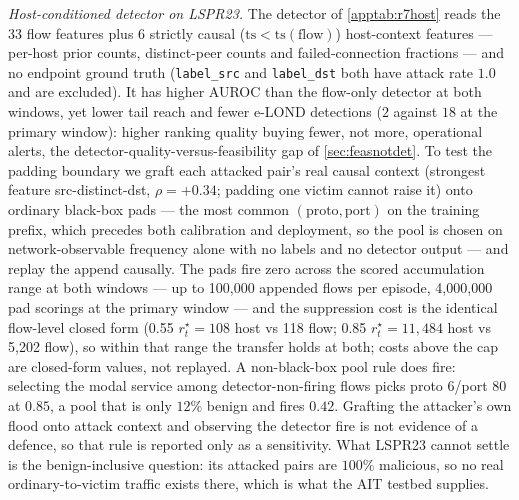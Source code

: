 \emph{Host-conditioned detector on LSPR23.} The detector of \cref{apptab:r7host} reads the 33 flow
features plus 6 strictly causal ($\mathrm{ts}<\mathrm{ts}(\text{flow})$) host-context features ---
per-host prior counts, distinct-peer counts and failed-connection fractions --- and no endpoint ground
truth (\texttt{label\_src} and \texttt{label\_dst} both have attack rate $1.0$ and are excluded). It has
higher AUROC than the flow-only detector at both windows, yet lower tail reach and fewer e-LOND
detections ($2$ against $18$ at the primary window): higher ranking quality buying fewer, not more,
operational alerts, the detector-quality-versus-feasibility gap of \cref{sec:feasnotdet}. To test the
padding boundary we graft each attacked pair's real causal context (strongest feature src-distinct-dst,
$\rho=+0.34$; padding one victim cannot raise it) onto ordinary black-box pads ---
the most common $(\text{proto},\text{port})$ on the training prefix, which precedes both calibration
and deployment, so the pool is chosen on network-observable frequency alone with no labels and no
detector output --- and replay the append causally. The pads fire zero across the scored accumulation
range at both windows --- up to 100{,}000 appended flows per episode, 4{,}000{,}000 pad scorings at the
primary window --- and the suppression cost is the identical flow-level closed form (0.55 $r^{\star}_t=108$ host vs 118 flow; 0.85 $r^{\star}_t=11{,}484$ host vs 5{,}202 flow),
so within that range the transfer holds at both; costs above the cap are closed-form values, not
replayed. A non-black-box pool rule does fire: selecting the modal service among detector-non-firing
flows picks proto 6/port 80 at $0.85$, a pool that is only $12\%$ benign and fires $0.42$. Grafting the attacker's own flood onto attack context and
observing the detector fire is not evidence of a defence, so that rule is reported only as a
sensitivity. What LSPR23 cannot settle is the benign-inclusive question: its attacked pairs are $100\%$
malicious, so no real ordinary-to-victim traffic exists there, which is what the AIT testbed supplies.
